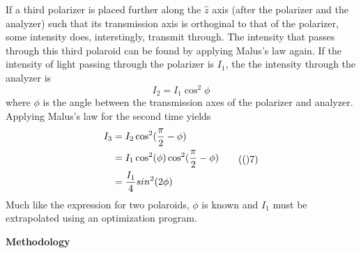 \documentclass[11pt]{article}
\begin{document}
\begin{multicols}{2}
    If a third polarizer is placed further along the $\hat{z}$ axis (after the polarizer and the analyzer) such that its transmission axis is orthoginal to that of the polarizer, some intensity does, interstingly, transmit through. The intensity that passes through this third polaroid can be found by applying Malus's law again. If the intensity of light passing through the polarizer is $I_1$, the the intensity through the analyzer is
    \[
        I_2 = I_1 \cos^2 \phi
    \]
    where $\phi$ is the angle between the transmission axes of the polarizer and analyzer. Applying Malus's law for the second time yields
    \begin{equation}
        \begin{split}
            I_3 &= I_2 \cos^2 (\frac{\pi}{2} - \phi) \\
            &= I_1 \cos^2 (\phi) \cos^2 (\frac{\pi}{2} - \phi) \\
            & = \frac{I_1}{4} sin^2 (2 \phi)
        \end{split} \tag(7)
    \end{equation}
    Much like the expression for two polaroids, $\phi$ is known and $I_1$ must be extrapolated using an optimization program. 
    


    \vspace{20pt}

     \selectfont \textbf{Methodology}
    
     \selectfont 


    

\end{multicols}
\end{document}

